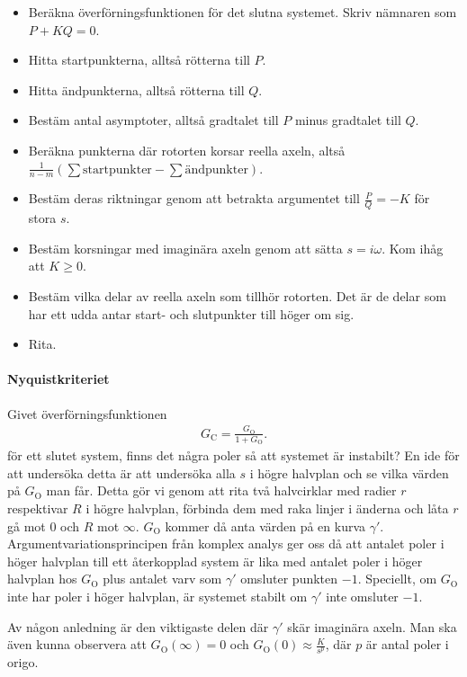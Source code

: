 \begin{itemize}
	\item Beräkna överförningsfunktionen för det slutna systemet. Skriv nämnaren som $P + KQ = 0$.
	\item Hitta startpunkterna, alltså rötterna till $P$.
	\item Hitta ändpunkterna, alltså rötterna till $Q$.
	\item Bestäm antal asymptoter, alltså gradtalet till $P$ minus gradtalet till $Q$.
	\item Beräkna punkterna där rotorten korsar reella axeln, altså $\frac{1}{n - m}(\sum\text{startpunkter} - \sum\text{ändpunkter})$.
	\item Bestäm deras riktningar genom att betrakta argumentet till $\frac{P}{Q} = -K$ för stora $s$.
	\item Bestäm korsningar med imaginära axeln genom att sätta $s = i\omega$. Kom ihåg att $K\geq 0$.
	\item Bestäm vilka delar av reella axeln som tillhör rotorten. Det är de delar som har ett udda antar start- och slutpunkter till höger om sig.
	\item Rita.
\end{itemize}

\paragraph{Nyquistkriteriet}
Givet överförningsfunktionen
\begin{align*}
	G_{\text{C}} = \frac{G_{\text{O}}}{1 + G_{\text{O}}}.
\end{align*}
för ett slutet system, finns det några poler så att systemet är instabilt? En ide för att undersöka detta är att undersöka alla $s$ i högre halvplan och se vilka värden på $G_{\text{O}}$ man får. Detta gör vi genom att rita två halvcirklar med radier $r$ respektivar $R$ i högre halvplan, förbinda dem med raka linjer i änderna och låta $r$ gå mot $0$ och $R$ mot $\infty$. $G_{\text{O}}$ kommer då anta värden på en kurva $\gamma'$. Argumentvariationsprincipen från komplex analys ger oss då att antalet poler i höger halvplan till ett återkopplad system är lika med antalet poler i höger halvplan hos $G_{\text{O}}$ plus antalet varv som $\gamma'$ omsluter punkten $-1$. Speciellt, om $G_{\text{O}}$ inte har poler i höger halvplan, är systemet stabilt om $\gamma'$ inte omsluter $-1$.

Av någon anledning är den viktigaste delen där $\gamma'$ skär imaginära axeln. Man ska även kunna observera att $G_{\text{O}}(\infty) = 0$ och $G_{\text{O}}(0)\approx\frac{K}{s^{p}}$, där $p$ är antal poler i origo.